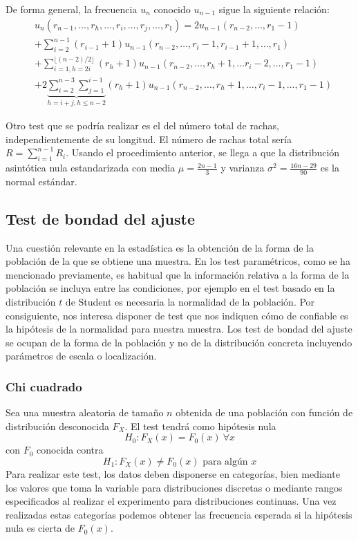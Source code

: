 	De forma general, la frecuencia $u_n$ conocido $u_{n-1}$ sigue la siguiente relación:
\begin{align*}
	& u_n (r_{n-1}, \dots, r_h, \dots, r_i, \dots, r_j, \dots, r_1)= 
		2 u_{n-1}(r_{n-2}, \dots, r_1-1) \\
	&+ \sum\limits_{i=2}^{n-1} 
		(r_{i-1} + 1)
		u_{n-1}(r_{n-2},\dots, r_i-1, r_{i-1}+1,\dots, r_1)\\
	&+ \sum\limits_{i=1, h=2i}^{\lfloor (n-2)/2 \rfloor} 
		(r_{h} + 1)
		u_{n-1}(r_{n-2},\dots, r_h+1,\dots r_i-2,\dots, r_1-1)\\
	&+ 2 \underbrace{\sum\limits_{i=2}^{n-3} \sum\limits_{j=1}^{i-1}}_{h=i+j, h \leq n-2}
		(r_{h} + 1)
		u_{n-1}(r_{n-2},\dots, r_h+1,\dots, r_i-1,\dots, r_1-1)			
\end{align*}
	
	Otro test que se podría realizar es el del número total de rachas, independientemente de su longitud. El número de rachas total sería $R = \sum\limits_{i=1}^{n-1} R_i$. Usando el procedimiento anterior, se llega a que la distribución asintótica nula estandarizada con media $\mu = \frac{2n-1}{3}$ y varianza $\sigma^2=\frac{16n-29}{90}$ es la normal estándar.
	
\subsection{Test de bondad del ajuste}

	Una cuestión relevante en la estadística es la obtención de la forma de la población de la que se obtiene una muestra. En los test paramétricos, como se ha mencionado previamente, es habitual que la información relativa a la forma de la población se incluya entre las condiciones, por ejemplo en el test basado en la distribución $t$ de Student es necesaria la normalidad de la población. Por consiguiente, nos interesa disponer de test que nos indiquen cómo de confiable es la hipótesis de la normalidad para nuestra muestra. Los test de bondad del ajuste se ocupan de la forma de la población y no de la distribución concreta incluyendo parámetros de escala o localización.
	
\subsubsection{Chi cuadrado}

	Sea una muestra aleatoria de tamaño $n$ obtenida de una población con función de distribución desconocida $F_X$. El test tendrá como hipótesis nula
		\[ H_0: F_X(x) = F_0(x) \ \forall x \]
	con $F_0$ conocida contra
		\[ H_1: F_X(x) \neq F_0(x) \text{ para algún }  x \]
	Para realizar este test, los datos deben disponerse en categorías, bien mediante los valores que toma la variable para distribuciones discretas o mediante rangos especificados al realizar el experimento para distribuciones continuas. Una vez realizadas estas categorías podemos obtener las frecuencia esperada si la hipótesis nula es cierta de $F_0(x)$.\\
	
